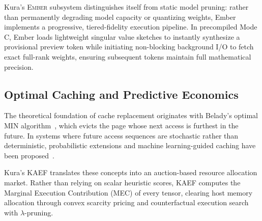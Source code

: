 Kura's \textsc{Ember} subsystem distinguishes itself from static model pruning: rather than permanently degrading model capacity or quantizing weights, Ember implements a progressive, tiered-fidelity execution pipeline. In precompiled Mode C, Ember loads lightweight singular value sketches to instantly synthesize a provisional preview token while initiating non-blocking background I/O to fetch exact full-rank weights, ensuring subsequent tokens maintain full mathematical precision.

\subsection{Optimal Caching and Predictive Economics}
The theoretical foundation of cache replacement originates with Belady's optimal MIN algorithm~\citep{belady1966study}, which evicts the page whose next access is furthest in the future. In systems where future access sequences are stochastic rather than deterministic, probabilistic extensions and machine learning-guided caching have been proposed~\citep{song2020learning}. 

Kura's \textsc{KAEF} translates these concepts into an auction-based resource allocation market. Rather than relying on scalar heuristic scores, KAEF computes the Marginal Execution Contribution (MEC) of every tensor, clearing host memory allocation through convex scarcity pricing and counterfactual execution search with $\lambda$-pruning.
